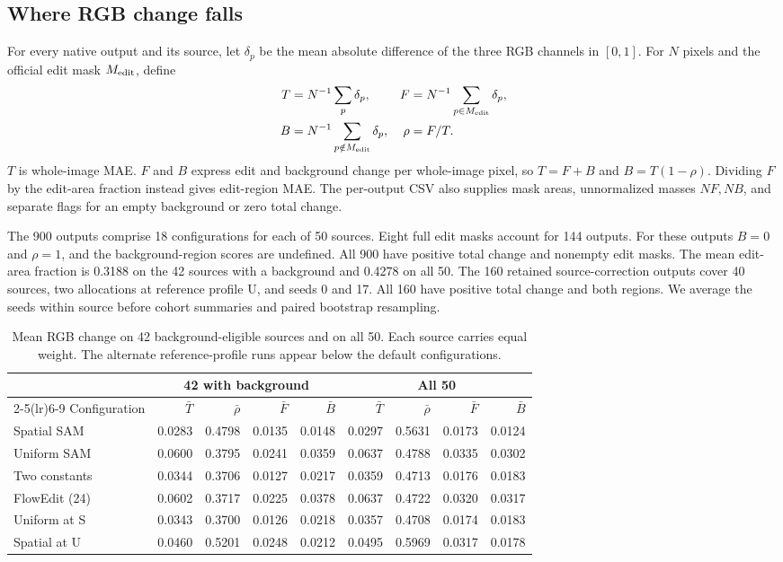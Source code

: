 \subsection{Where RGB change falls}
\label{sec:v19-pixel}
For every native output and its source, let $\delta_p$ be the mean absolute difference of the three RGB channels in $[0,1]$. For $N$ pixels and the official edit mask $M_{\rm edit}$, define
\[
 \begin{aligned}
T&=N^{-1}\sum_p\delta_p, & F&=N^{-1}\sum_{p\in M_{\rm edit}}\delta_p,\\
B&=N^{-1}\sum_{p\notin M_{\rm edit}}\delta_p, & \rho&=F/T .
\end{aligned}
\]
$T$ is whole-image MAE. $F$ and $B$ express edit and background change per whole-image pixel, so $T=F+B$ and $B=T(1-\rho)$. Dividing $F$ by the edit-area fraction instead gives edit-region MAE. The per-output CSV also supplies mask areas, unnormalized masses $NF,NB$, and separate flags for an empty background or zero total change.

The 900 outputs comprise 18 configurations for each of 50 sources. Eight full edit masks account for 144 outputs. For these outputs $B=0$ and $\rho=1$, and the background-region scores are undefined. All 900 have positive total change and nonempty edit masks. The mean edit-area fraction is 0.3188 on the 42 sources with a background and 0.4278 on all 50. The 160 retained source-correction outputs cover 40 sources, two allocations at reference profile U, and seeds 0 and 17. All 160 have positive total change and both regions. We average the seeds within source before cohort summaries and paired bootstrap resampling.

\begin{table}[t]
\centering\small
\caption{Mean RGB change on 42 background-eligible sources and on all 50. Each source carries equal weight. The alternate reference-profile runs appear below the default configurations.}
\label{tab:v19-pixel-levels}
\setlength{\tabcolsep}{4.0pt}
\begin{tabular}{lrrrrrrrr}
\toprule
&\multicolumn{4}{c}{42 with background}&\multicolumn{4}{c}{All 50}\\
\cmidrule(lr){2-5}\cmidrule(lr){6-9}
Configuration &$\bar T$&$\bar\rho$&$\bar F$&$\bar B$&$\bar T$&$\bar\rho$&$\bar F$&$\bar B$\\
\midrule
Spatial SAM & 0.0283 & 0.4798 & 0.0135 & 0.0148 & 0.0297 & 0.5631 & 0.0173 & 0.0124 \\
Uniform SAM & 0.0600 & 0.3795 & 0.0241 & 0.0359 & 0.0637 & 0.4788 & 0.0335 & 0.0302 \\
Two constants & 0.0344 & 0.3706 & 0.0127 & 0.0217 & 0.0359 & 0.4713 & 0.0176 & 0.0183 \\
FlowEdit (24) & 0.0602 & 0.3717 & 0.0225 & 0.0378 & 0.0637 & 0.4722 & 0.0320 & 0.0317 \\
\midrule
Uniform at S & 0.0343 & 0.3700 & 0.0126 & 0.0218 & 0.0357 & 0.4708 & 0.0174 & 0.0183 \\
Spatial at U & 0.0460 & 0.5201 & 0.0248 & 0.0212 & 0.0495 & 0.5969 & 0.0317 & 0.0178 \\
\bottomrule\end{tabular}\end{table}

